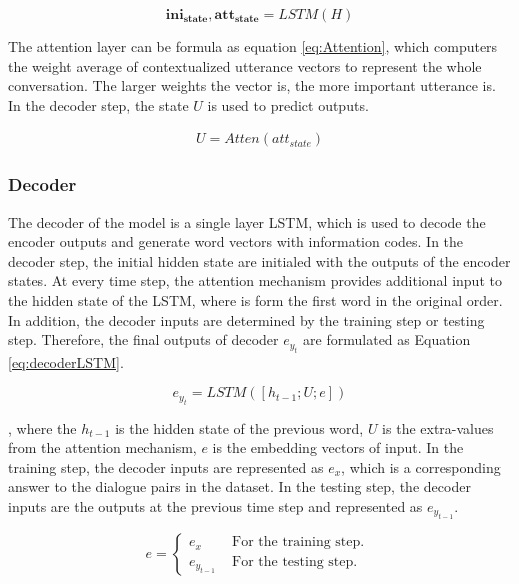 {{\begin{equation} \label{eq:LASTLSTM}
\mathbf{ini_{state}, att_{state}} = LSTM\left(H\right)
\end{equation}

The attention layer can be formula as equation \ref{eq:Attention}, which computers the weight average of contextualized utterance vectors to represent the whole conversation. The larger weights the vector is, the more important utterance is. In the decoder step, the state $U$ is used to predict outputs.

\begin{equation} \label{eq:Attention}
\begin{array}{l}
U = Atten\left(att_{state}\right)
\end{array}
\end{equation}



\subsubsection{Decoder}
The decoder of the model is a single layer LSTM, which is used to decode the encoder outputs and generate word vectors with information codes. In the decoder step, the initial hidden state are initialed with the outputs of the encoder states. At every time step, the attention mechanism provides additional input to the hidden state of the LSTM, where is form the first word in the original order. In addition, the decoder inputs are determined by the training step or testing step. Therefore, the final outputs of decoder $e_{y_{t}}$ are formulated as Equation \ref{eq:decoderLSTM}.

\begin{equation}
\label{eq:decoderLSTM}
e_{y_{t}} = LSTM\left(\left[h_{t-1};U;e\right]\right)
\end{equation}


, where the $h_{t-1}$ is the hidden state of the previous word, $U$ is the extra-values from the attention mechanism, $e$ is the embedding vectors of input. In the training step, the decoder inputs are represented as $e_{x}$, which is a corresponding answer to the dialogue pairs in the dataset. In the testing step, the decoder inputs are the outputs at the previous time step and represented as $e_{y_{t-1}}$.

\begin{equation}
e=\left\{\begin{array}{ll}{e_{x}} & {\text { For the training step. }} \\ {e_{y_{t-1}}} & {\text { For the testing step. }}\end{array}\right.
\end{equation}

}}
